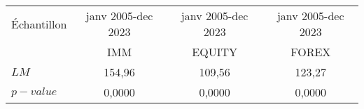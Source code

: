 \begin{tabular}{lccc}
\toprule
Échantillon & janv 2005-dec 2023 & janv 2005-dec 2023 & janv 2005-dec 2023 \\
      &  IMM &  EQUITY & FOREX \\  
\cmidrule(r){1-1} \cmidrule(lr){2-2}\cmidrule(l){3-3} \cmidrule(l){4-4}
    $LM$       &  154,96   &  109,56 & 123,27    \\
    $p-value$        & 0,0000   &  0,0000 & 0,0000      \\ 
\bottomrule
\end{tabular}